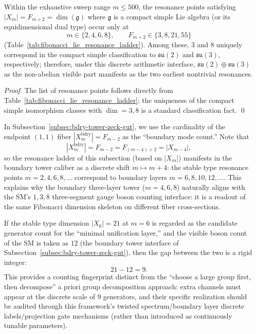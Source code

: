 \begin{corollary}\label{cor:fib-lie-resonance-scarcity-su2-su3}
Within the exhaustive sweep range \(m\le 500\), the resonance points satisfying
\(
|X_m|=F_{m+2}=\dim(\mathfrak g)
\)
where \(\mathfrak g\) is a compact simple Lie algebra (or its equidimensional dual type) occur only at
\[
m\in\{2,4,6,8\},
\qquad
F_{m+2}\in\{3,8,21,55\}
\]
(Table~\ref{tab:fibonacci_lie_resonance_ladder}).
Among these, \(3\) and \(8\) uniquely correspond in the compact simple classification to \(\mathfrak{su}(2)\) and \(\mathfrak{su}(3)\), respectively;
therefore, under this discrete arithmetic interface, \(\mathfrak{su}(2)\oplus\mathfrak{su}(3)\) as the non-abelian visible part manifests as the two earliest nontrivial resonances.
\end{corollary}
\begin{proof}
The list of resonance points follows directly from Table~\ref{tab:fibonacci_lie_resonance_ladder}; the uniqueness of the compact simple isomorphism classes with \(\dim=3,8\) is a standard classification fact. \qed
\end{proof}

\begin{remark}\label{rem:fib-lie-resonance-shift-by-4}
In Subsection~\ref{subsec:bdry-tower-zeck-gut}, we use the cardinality of the endpoint \((1,1)\) fiber
\(
|X_m^{\mathrm{bdry}}|=F_{m-2}
\)
as the ``boundary mode count.''
Note that
\[
|X_m^{\mathrm{bdry}}|=F_{m-2}=F_{(m-4)+2}=|X_{m-4}|,
\]
so the resonance ladder of this subsection (based on \(|X_m|\)) manifests in the boundary tower caliber as a discrete shift \(m\mapsto m+4\):
the stable type resonance points \(m=2,4,6,8,\dots\) correspond to boundary layers \(m=6,8,10,12,\dots\).
This explains why the boundary three-layer tower (\(m=4,6,8\)) naturally aligns with the SM's \(1,3,8\) three-segment gauge boson counting interface:
it is a readout of the same Fibonacci dimension skeleton on different fiber cross-sections.
\end{remark}

\begin{remark}[Minimal extra generator count: \(21-12=9\)]\label{rem:fib-lie-extra-9}
If the stable type dimension \( |X_6|=21 \) at \(m=6\) is regarded as the candidate generator count for the ``minimal unification layer,''
and the visible boson count of the SM is taken as \(12\) (the boundary tower interface of Subsection~\ref{subsec:bdry-tower-zeck-gut}),
then the gap between the two is a rigid integer:
\[
21-12=9.
\]
This provides a counting fingerprint distinct from the ``choose a large group first, then decompose'' a priori group decomposition approach: extra channels must appear at the discrete scale of \(9\) generators,
and their specific realization should be audited through this framework's twisted spectrum/boundary layer discrete labels/projection gate mechanisms (rather than introduced as continuously tunable parameters).
\end{remark}

